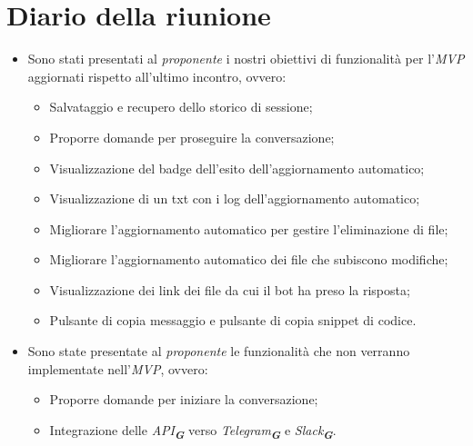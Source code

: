 
\section{Diario della riunione}

\begin{itemize}
    \item Sono stati presentati al \emph{proponente} i nostri obiettivi di funzionalità per l'\emph{MVP} aggiornati rispetto all'ultimo incontro, ovvero: 
        \begin{itemize}
            \item Salvataggio e recupero dello storico di sessione;
            \item Proporre domande per proseguire la conversazione;
            \item Visualizzazione del badge dell’esito dell’aggiornamento automatico;
            \item Visualizzazione di un txt con i log dell’aggiornamento automatico;
            \item Migliorare l’aggiornamento automatico per gestire l’eliminazione di file;
            \item Migliorare l’aggiornamento automatico dei file che subiscono modifiche;
            \item Visualizzazione dei link dei file da cui il bot ha preso la risposta;
            \item Pulsante di copia messaggio e pulsante di copia snippet di codice.
        \end{itemize}
    \item Sono state presentate al \emph{proponente} le funzionalità che non verranno implementate nell'\emph{MVP}, ovvero:
        \begin{itemize}
            \item Proporre domande per iniziare la conversazione;
            \item Integrazione delle \emph{API}\textsubscript{\textbf{\textit{G}}} verso
            \emph{Telegram}\textsubscript{\textbf{\textit{G}}} e \emph{Slack}\textsubscript{\textbf{\textit{G}}}.
        \end{itemize}


\end{itemize}
